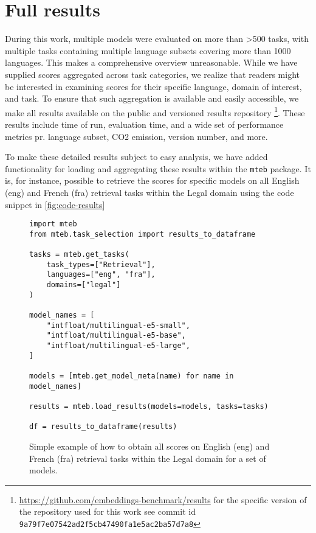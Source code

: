 \section{Full results}
\label{sec:fullresults}

During this work, multiple models were evaluated on more than >500 tasks, with multiple tasks containing multiple language subsets covering more than 1000 languages. This makes a comprehensive overview unreasonable.  While we have supplied scores aggregated across task categories, we realize that readers might be interested in examining scores for their specific language, domain of interest, and task. To ensure that such aggregation is available and easily accessible, we make all results available on the public and versioned results repository \footnote{\url{https://github.com/embeddings-benchmark/results} for the specific version of the repository used for this work see commit id \texttt{9a79f7e07542ad2f5cb47490fa1e5ac2ba57d7a8}}. These results include time of run, evaluation time, and a wide set of performance metrics pr. language subset, CO2 emission, version number, and more. 

To make these detailed results subject to easy analysis, we have added functionality for loading and aggregating these results within the \texttt{mteb} package. It is, for instance, possible to retrieve the scores for specific models on all English (eng) and French (fra) retrieval tasks within the Legal domain using the code snippet in \autoref{fig:code-results}


\begin{figure}
\begin{lstlisting}[style=pythonstyle]
import mteb
from mteb.task_selection import results_to_dataframe

tasks = mteb.get_tasks(
    task_types=["Retrieval"], 
    languages=["eng", "fra"], 
    domains=["legal"]
)

model_names = [
    "intfloat/multilingual-e5-small",
    "intfloat/multilingual-e5-base",
    "intfloat/multilingual-e5-large",
]

models = [mteb.get_model_meta(name) for name in model_names]

results = mteb.load_results(models=models, tasks=tasks)

df = results_to_dataframe(results)

\end{lstlisting}
\caption{Simple example of how to obtain all scores on English (eng) and French (fra) retrieval tasks within the Legal domain for a set of models.}
\label{fig:code-results}
\end{figure}



